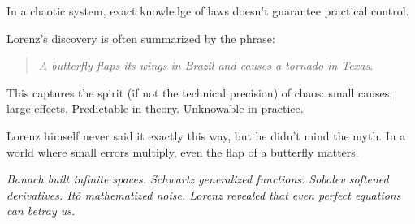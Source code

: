 In a chaotic system, exact knowledge of laws doesn’t guarantee practical control.

\begin{tcolorbox}[title=Historical Sidebar: The Butterfly Effect, colback=gray!5!white, colframe=black!80!white, fonttitle=\bfseries]

  Lorenz’s discovery is often summarized by the phrase:
  
  \medskip
  
  \begin{quote}
  \textit{A butterfly flaps its wings in Brazil and causes a tornado in Texas.}
  \end{quote}
  
  This captures the spirit (if not the technical precision) of chaos:  
  small causes, large effects.  
  Predictable in theory. Unknowable in practice.
  
  Lorenz himself never said it exactly this way, but he didn't mind the myth.  
  In a world where small errors multiply, even the flap of a butterfly matters.
\end{tcolorbox}

\vspace{1em}

\begin{center}
\textit{Banach built infinite spaces.  
Schwartz generalized functions.  
Sobolev softened derivatives.  
Itô mathematized noise.  
Lorenz revealed that even perfect equations can betray us.}
\end{center}


